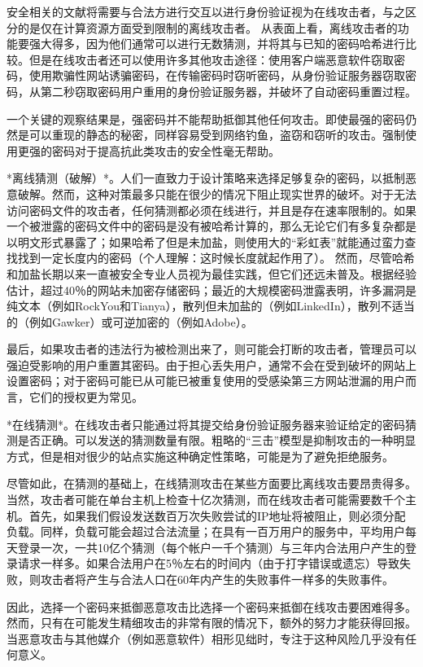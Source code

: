 安全相关的文献将需要与合法方进行交互以进行身份验证视为在线攻击者，与之区分的是仅在计算资源方面受到限制的离线攻击者。
从表面上看，离线攻击者的功能要强大得多，因为他们通常可以进行无数猜测，并将其与已知的密码哈希进行比较。但是在线攻击者还可以使用许多其他攻击途径：使用客户端恶意软件窃取密码，使用欺骗性网站诱骗密码，在传输密码时窃听密码，从身份验证服务器窃取密码，从第二秒窃取密码用户重用的身份验证服务器，并破坏了自动密码重置过程。

一个关键的观察结果是，强密码并不能帮助抵御其他任何攻击。即使最强的密码仍然是可以重现的静态的秘密，同样容易受到网络钓鱼，盗窃和窃听的攻击。强制使用更强的密码对于提高抗此类攻击的安全性毫无帮助。

*离线猜测（破解）*。人们一直致力于设计策略来选择足够复杂的密码，以抵制恶意破解。然而，这种对策最多只能在很少的情况下阻止现实世界的破坏。对于无法访问密码文件的攻击者，任何猜测都必须在线进行，并且是存在速率限制的。如果一个被泄露的密码文件中的密码是没有被哈希计算的，那么无论它们有多复杂都是以明文形式暴露了；如果哈希了但是未加盐，则使用大的“彩虹表”就能通过蛮力查找找到一定长度内的密码（个人理解：这时候长度就起作用了）。 然而，尽管哈希和加盐长期以来一直被安全专业人员视为最佳实践，但它们还远未普及。根据经验估计，超过40％的网站未加密存储密码；最近的大规模密码泄露表明，许多漏洞是纯文本（例如RockYou和Tianya），散列但未加盐的（例如LinkedIn），散列不适当的（例如Gawker）或可逆加密的（例如Adobe）。

最后，如果攻击者的违法行为被检测出来了，则可能会打断的攻击者，管理员可以强迫受影响的用户重置其密码。由于担心丢失用户，通常不会在受到破坏的网站上设置密码；对于密码可能已从可能已被重复使用的受感染第三方网站泄漏的用户而言，它们的授权更为常见。

*在线猜测*。在线攻击者只能通过将其提交给身份验证服务器来验证给定的密码猜测是否正确。可以发送的猜测数量有限。粗略的“三击”模型是抑制攻击的一种明显方式，但是相对很少的站点实施这种确定性策略，可能是为了避免拒绝服务。

尽管如此，在猜测的基础上，在线猜测攻击在某些方面要比离线攻击要昂贵得多。当然，攻击者可能在单台主机上检查十亿次猜测，而在线攻击者可能需要数千个主机。首先，如果我们假设发送数百万次失败尝试的IP地址将被阻止，则必须分配负载。同样，负载可能会超过合法流量；在具有一百万用户的服务中，平均用户每天登录一次，一共10亿个猜测（每个帐户一千个猜测）与三年内合法用户产生的登录请求一样多。如果合法用户在5％左右的时间内（由于打字错误或遗忘）导致失败，则攻击者将产生与合法人口在60年内产生的失败事件一样多的失败事件。

因此，选择一个密码来抵御恶意攻击比选择一个密码来抵御在线攻击要困难得多。然而，只有在可能发生精细攻击的非常有限的情况下，额外的努力才能获得回报。当恶意攻击与其他媒介（例如恶意软件）相形见绌时，专注于这种风险几乎没有任何意义。

